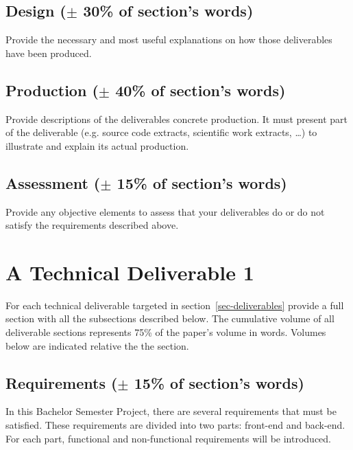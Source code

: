 \documentclass[conference,compsoc]{IEEEtran}
\begin{document}
\subsection{Design ($\pm$ 30\% of section's words)}
Provide the necessary and most useful explanations on how those deliverables have been produced.
\subsection{Production ($\pm$ 40\% of section's words)}
Provide descriptions of the deliverables concrete production. It must present part of the deliverable (e.g. source code extracts, scientific work extracts, \ldots) to illustrate and explain its actual production.
\subsection{Assessment ($\pm$ 15\% of section's words)}
Provide any objective elements to assess that your deliverables do or do not satisfy the requirements described above. 

\section{ A Technical Deliverable 1}
For each technical deliverable targeted in section~\ref{sec-deliverables} provide a full section with all the subsections described below.
The cumulative volume of all deliverable sections represents 75\% of the paper's volume in words. Volumes below are indicated relative the the section.
\label{sec-production}
\subsection{Requirements ($\pm$ 15\% of section's words)}
In this Bachelor Semester Project, there are several requirements that must be satisfied. These requirements are divided into two parts: front-end and back-end. For each part, functional and non-functional requirements will be introduced. 

\setcounter{secnumdepth}{5}
\end{document}
